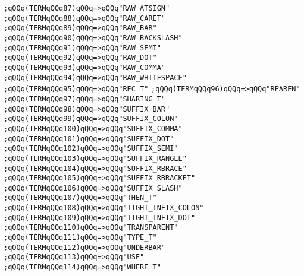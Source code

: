 \verb|;qQQq(TERMqQQq87)qQQq=>qQQq"RAW_ATSIGN"|\newline
\verb|;qQQq(TERMqQQq88)qQQq=>qQQq"RAW_CARET"|\newline
\verb|;qQQq(TERMqQQq89)qQQq=>qQQq"RAW_BAR"|\newline
\verb|;qQQq(TERMqQQq90)qQQq=>qQQq"RAW_BACKSLASH"|\newline
\verb|;qQQq(TERMqQQq91)qQQq=>qQQq"RAW_SEMI"|\newline
\verb|;qQQq(TERMqQQq92)qQQq=>qQQq"RAW_DOT"|\newline
\verb|;qQQq(TERMqQQq93)qQQq=>qQQq"RAW_COMMA"|\newline
\verb|;qQQq(TERMqQQq94)qQQq=>qQQq"RAW_WHITESPACE"|\newline
\verb|;qQQq(TERMqQQq95)qQQq=>qQQq"REC_T"|\newline
\verb|;qQQq(TERMqQQq96)qQQq=>qQQq"RPAREN"|\newline
\verb|;qQQq(TERMqQQq97)qQQq=>qQQq"SHARING_T"|\newline
\verb|;qQQq(TERMqQQq98)qQQq=>qQQq"SUFFIX_BAR"|\newline
\verb|;qQQq(TERMqQQq99)qQQq=>qQQq"SUFFIX_COLON"|\newline
\verb|;qQQq(TERMqQQq100)qQQq=>qQQq"SUFFIX_COMMA"|\newline
\verb|;qQQq(TERMqQQq101)qQQq=>qQQq"SUFFIX_DOT"|\newline
\verb|;qQQq(TERMqQQq102)qQQq=>qQQq"SUFFIX_SEMI"|\newline
\verb|;qQQq(TERMqQQq103)qQQq=>qQQq"SUFFIX_RANGLE"|\newline
\verb|;qQQq(TERMqQQq104)qQQq=>qQQq"SUFFIX_RBRACE"|\newline
\verb|;qQQq(TERMqQQq105)qQQq=>qQQq"SUFFIX_RBRACKET"|\newline
\verb|;qQQq(TERMqQQq106)qQQq=>qQQq"SUFFIX_SLASH"|\newline
\verb|;qQQq(TERMqQQq107)qQQq=>qQQq"THEN_T"|\newline
\verb|;qQQq(TERMqQQq108)qQQq=>qQQq"TIGHT_INFIX_COLON"|\newline
\verb|;qQQq(TERMqQQq109)qQQq=>qQQq"TIGHT_INFIX_DOT"|\newline
\verb|;qQQq(TERMqQQq110)qQQq=>qQQq"TRANSPARENT"|\newline
\verb|;qQQq(TERMqQQq111)qQQq=>qQQq"TYPE_T"|\newline
\verb|;qQQq(TERMqQQq112)qQQq=>qQQq"UNDERBAR"|\newline
\verb|;qQQq(TERMqQQq113)qQQq=>qQQq"USE"|\newline
\verb|;qQQq(TERMqQQq114)qQQq=>qQQq"WHERE_T"|\newline
